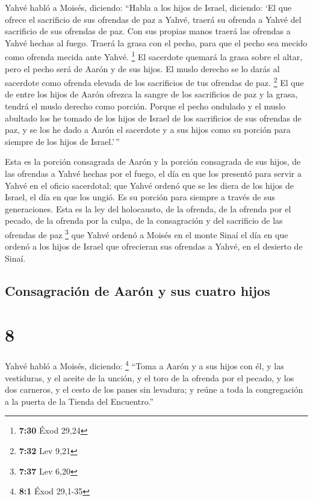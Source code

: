  Yahvé habló a Moisés, diciendo:  ``Habla
a los hijos de Israel, diciendo: `El que ofrece el sacrificio de sus
ofrendas de paz a Yahvé, traerá su ofrenda a Yahvé del sacrificio de sus
ofrendas de paz.  Con sus propias manos traerá las
ofrendas a Yahvé hechas al fuego. Traerá la grasa con el pecho, para que
el pecho sea mecido como ofrenda mecida ante Yahvé. \footnote{\textbf{7:30}
  Éxod 29,24}  El sacerdote quemará la grasa sobre el
altar, pero el pecho será de Aarón y de sus hijos.  El
muslo derecho se lo darás al sacerdote como ofrenda elevada de los
sacrificios de tus ofrendas de paz. \footnote{\textbf{7:32} Lev 9,21}
 El que de entre los hijos de Aarón ofrezca la sangre de
los sacrificios de paz y la grasa, tendrá el muslo derecho como porción.
 Porque el pecho ondulado y el muslo abultado los he
tomado de los hijos de Israel de los sacrificios de sus ofrendas de paz,
y se los he dado a Aarón el sacerdote y a sus hijos como su porción para
siempre de los hijos de Israel.'\,''

 Esta es la porción consagrada de Aarón y la porción
consagrada de sus hijos, de las ofrendas a Yahvé hechas por el fuego, el
día en que los presentó para servir a Yahvé en el oficio sacerdotal;
 que Yahvé ordenó que se les diera de los hijos de
Israel, el día en que los ungió. Es su porción para siempre a través de
sus generaciones.  Esta es la ley del holocausto, de la
ofrenda, de la ofrenda por el pecado, de la ofrenda por la culpa, de la
consagración y del sacrificio de las ofrendas de paz \footnote{\textbf{7:37}
  Lev 6,20}  que Yahvé ordenó a Moisés en el monte Sinaí
el día en que ordenó a los hijos de Israel que ofrecieran sus ofrendas a
Yahvé, en el desierto de Sinaí.

\hypertarget{consagraciuxf3n-de-aaruxf3n-y-sus-cuatro-hijos}{%
\subsection{Consagración de Aarón y sus cuatro
hijos}\label{consagraciuxf3n-de-aaruxf3n-y-sus-cuatro-hijos}}

\hypertarget{section-7}{%
\section{8}\label{section-7}}

 Yahvé habló a Moisés, diciendo: \footnote{\textbf{8:1}
  Éxod 29,1-35}  ``Toma a Aarón y a sus hijos con él, y
las vestiduras, y el aceite de la unción, y el toro de la ofrenda por el
pecado, y los dos carneros, y el cesto de los panes sin levadura;
 y reúne a toda la congregación a la puerta de la Tienda
del Encuentro.''

